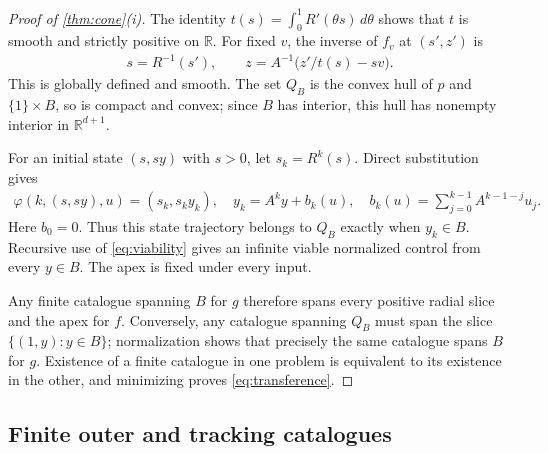 \documentclass[11pt,a4paper]{article}
\theoremstyle{definition}
\theoremstyle{remark}
\begin{document}
\begin{proof}[Proof of \cref{thm:cone}(i)]
The identity \(t(s)=\int_0^1R'(\theta s)\,d\theta\) shows that \(t\) is smooth and strictly positive on \(\mathbb R\). For fixed \(v\), the inverse of \(f_v\) at \((s',z')\) is
\begin{align*}
 s=R^{-1}(s'),\qquad z=A^{-1}\bigl(z'/t(s)-sv\bigr).
\end{align*}
This is globally defined and smooth. The set \(Q_B\) is the convex hull of \(p\) and \(\{1\}\times B\), so is compact and convex; since \(B\) has interior, this hull has nonempty interior in \(\mathbb R^{d+1}\).

For an initial state \((s,sy)\) with \(s>0\), let \(s_k=R^k(s)\). Direct substitution gives
\begin{align}\label{eq:normalized}
 \varphi(k,(s,sy),u)=(s_k,s_k y_k),\quad
 y_k=A^k y+b_k(u),\quad
 b_k(u)=\sum_{j=0}^{k-1}A^{k-1-j}u_j.
\end{align}
Here \(b_0=0\). Thus this state trajectory belongs to \(Q_B\) exactly when \(y_k\in B\). Recursive use of \eqref{eq:viability} gives an infinite viable normalized control from every \(y\in B\). The apex is fixed under every input.

Any finite catalogue spanning \(B\) for \(g\) therefore spans every positive radial slice and the apex for \(f\). Conversely, any catalogue spanning \(Q_B\) must span the slice \(\{(1,y):y\in B\}\); normalization shows that precisely the same catalogue spans \(B\) for \(g\). Existence of a finite catalogue in one problem is equivalent to its existence in the other, and minimizing proves \eqref{eq:transference}.
\end{proof}

\subsection{Finite outer and tracking catalogues}
\end{document}
